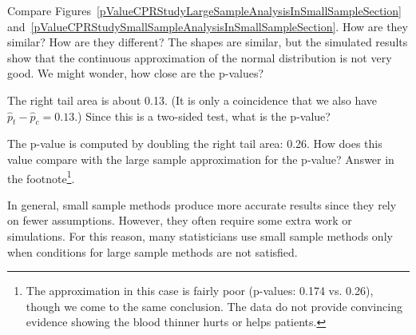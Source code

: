 \begin{example}{Compare Figures~\ref{pValueCPRStudyLargeSampleAnalysisInSmallSampleSection} and~\ref{pValueCPRStudySmallSampleAnalysisInSmallSampleSection}. How are they similar? How are they different?}
The shapes are similar, but the simulated results show that the continuous approximation of the normal distribution is not very good. We might wonder, how close are the p-values?
\end{example}

\begin{exercise}
The right tail area is about 0.13. (It is only a coincidence that we also have $\hat{p}_t - \hat{p}_c=0.13$.) Since this is a two-sided test, what is the p-value?
\end{exercise}

\begin{exercise} \label{comparisonOfLargeSampleAndSmallSamplePValueInCPRStudy}
The p-value is computed by doubling the right tail area: 0.26. How does this value compare with the large sample approximation for the p-value? Answer in the footnote\footnote{The approximation in this case is fairly poor (p-values: 0.174 vs. 0.26), though we come to the same conclusion. The data do not provide convincing evidence showing the blood thinner hurts or helps patients.}.
\end{exercise}



In general, small sample methods produce more accurate results since they rely on fewer assumptions. However, they often require some extra work or simulations. For this reason, many statisticians use small sample methods only when conditions for large sample methods are not satisfied.










